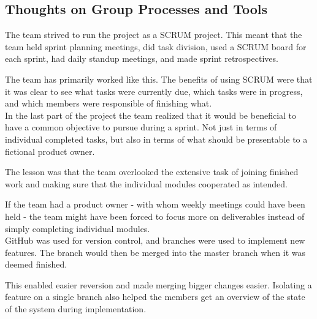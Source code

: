 \subsection{Thoughts on Group Processes and Tools}
The team strived to run the project as a SCRUM project. This meant that the team held sprint planning meetings, did task division, used a SCRUM board for each sprint, had daily standup meetings, and made sprint retrospectives. 

The team has primarily worked like this. The benefits of using SCRUM were that it was clear to see what tasks were currently due, which tasks were in progress, and which members were responsible of finishing what. \\

In the last part of the project the team realized that it would be beneficial to have a common objective to pursue during a sprint. Not just in terms of individual completed tasks, but also in terms of what should be presentable to a fictional product owner. 

The lesson was that the team overlooked the extensive task of joining finished work and making sure that the individual modules cooperated as intended. 

If the team had a product owner - with whom weekly meetings could have been held - the team might have been forced to focus more on deliverables instead of simply completing individual modules. \\

GitHub was used for version control, and branches were used to implement new features. The branch would then be merged into the master branch when it was deemed finished. 

This enabled easier reversion and made merging bigger changes easier. Isolating a feature on a single branch also helped the members get an overview of the state of the system during implementation. 